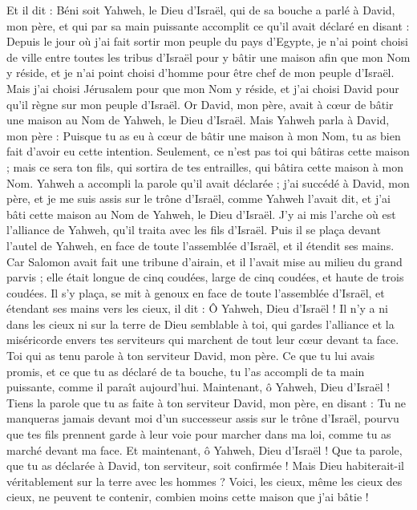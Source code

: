 \begin{multicols}{2}
Et il dit : Béni soit Yahweh, le Dieu d'Israël, qui de sa bouche a parlé à David, mon père, et qui par sa main puissante accomplit ce qu'il avait déclaré en disant :
Depuis le jour où j'ai fait sortir mon peuple du pays d'Egypte, je n'ai point choisi de ville entre toutes les tribus d'Israël pour y bâtir une maison afin que mon Nom y réside, et je n'ai point choisi d'homme pour être chef de mon peuple d'Israël.
Mais j'ai choisi Jérusalem pour que mon Nom y réside, et j'ai choisi David pour qu'il règne sur mon peuple d'Israël.
Or David, mon père, avait à cœur de bâtir une maison au Nom de Yahweh, le Dieu d'Israël.
Mais Yahweh parla à David, mon père : Puisque tu as eu à cœur de bâtir une maison à mon Nom, tu as bien fait d'avoir eu cette intention.
Seulement, ce n'est pas toi qui bâtiras cette maison ; mais ce sera ton fils, qui sortira de tes entrailles, qui bâtira cette maison à mon Nom.
Yahweh a accompli la parole qu'il avait déclarée ; j'ai succédé à David, mon père, et je me suis assis sur le trône d'Israël, comme Yahweh l'avait dit, et j'ai bâti cette maison au Nom de Yahweh, le Dieu d'Israël.
J'y ai mis l'arche où est l'alliance de Yahweh, qu'il traita avec les fils d'Israël.
Puis il se plaça devant l'autel de Yahweh, en face de toute l'assemblée d'Israël, et il étendit ses mains.
Car Salomon avait fait une tribune d'airain, et il l'avait mise au milieu du grand parvis ; elle était longue de cinq coudées, large de cinq coudées, et haute de trois coudées. Il s'y plaça, se mit à genoux en face de toute l'assemblée d'Israël, et étendant ses mains vers les cieux, il dit :
Ô Yahweh, Dieu d'Israël ! Il n'y a ni dans les cieux ni sur la terre de Dieu semblable à toi, qui gardes l'alliance et la miséricorde envers tes serviteurs qui marchent de tout leur cœur devant ta face.
Toi qui as tenu parole à ton serviteur David, mon père. Ce que tu lui avais promis, et ce que tu as déclaré de ta bouche, tu l'as accompli de ta main puissante, comme il paraît aujourd'hui.
Maintenant, ô Yahweh, Dieu d'Israël ! Tiens la parole que tu as faite à ton serviteur David, mon père, en disant : Tu ne manqueras jamais devant moi d'un successeur assis sur le trône d'Israël, pourvu que tes fils prennent garde à leur voie pour marcher dans ma loi, comme tu as marché devant ma face.
Et maintenant, ô Yahweh, Dieu d'Israël ! Que ta parole, que tu as déclarée à David, ton serviteur, soit confirmée !
Mais Dieu habiterait-il véritablement sur la terre avec les hommes ? Voici, les cieux, même les cieux des cieux, ne peuvent te contenir, combien moins cette maison que j'ai bâtie !

\end{multicols}
